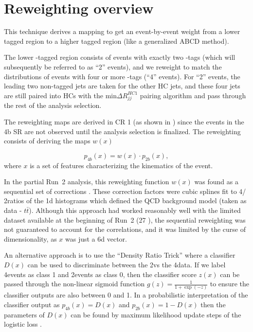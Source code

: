 \section{Reweighting overview}
\label{sec:rw-overview}

This technique derives a mapping to get an event-by-event weight from a lower tagged region to a higher tagged region (like a generalized ABCD method).

The lower \Pqb-tagged region consists of events with exactly two \Pqb-tags (which will subsequently be referred to as ``2\Pqb'' events), and we reweight to match the distributions of events with four or more \Pqb-tags (``4\Pqb'' events).  For ``2\Pqb'' events, the leading two non-\Pqb tagged jets are taken for the other HC jets, and these four jets are still paired into HCs with the $\text{min} \Delta R_{jj}^{HC 1}$ pairing algorithm and pass through the rest of the analysis selection.

The reweighting maps are derived in CR 1 (as shown in \Fig{\ref{fig:massplanes-allYrs-data}}) since the events in the 4b SR are not observed until the analysis selection is finalized. 
The reweighting consists of deriving the maps $w(x)$

\begin{equation}
	p_{4b}(x) = w(x) \cdot p_{2b}(x),
\end{equation}
\noindent
where $x$ is a set of features characterizing the kinematics of the event.

In the partial Run~2 analysis, this reweighting function $w(x)$  was found as a sequential set of corrections \cite{EXOT-2016-30}. These correction factors were cubic splines fit to 4\Pqb / 2\Pqb ratios of the 1d histograms which defined the QCD background model (taken as data - $t\bar{t}$). 
Although this approach had worked reasonably well with the limited dataset available at the beginning of Run~2 (27 \ifb), the sequential reweighting was not guaranteed to account for the correlations, and it was limited by the curse of dimensionality, as $x$ was just a 6d vector.

An alternative approach is to use the ``Density Ratio Trick'' where a classifier $D(x)$ can be used to discriminate between the 2\Pqb vs the 4\Pqb data. 
If we label 4\Pqb events as class 1 and 2\Pqb events as class 0, then the classifier score $z(x)$ can be passed through the non-linear sigmoid function $g(z) = \frac{1}{1 + \exp(-z)}$  to ensure the classifier outputs are also between 0 and 1.
In a probabilistic interpretation of the classifier output as $p_{4b} (x) = D(x)$ and $p_{2b}(x) = 1- D(x)$ then the parameters of $D(x)$ can be found by maximum likelihood update steps of the logistic loss \cite{cs229-notes1}.

